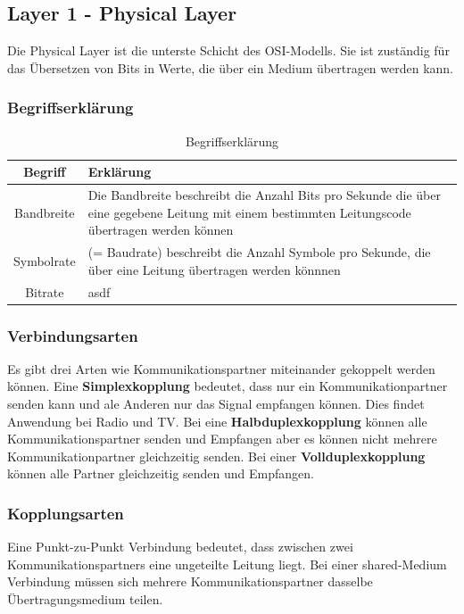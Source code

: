 \documentclass{article}
\begin{document}
\subsection{Layer 1 - Physical Layer}
Die Physical Layer ist die unterste Schicht des OSI-Modells. Sie ist zuständig für das Übersetzen von Bits in Werte, die über ein Medium übertragen werden kann.
\subsubsection{Begriffserklärung}
\begin{table}[h!]
		\begin{center}
				\caption{Begriffserklärung}
				\label{tab:Begriffserklärung}
				\begin{tabular}{|c|p{9cm}|}
						\hline
						\textbf{Begriff} & \textbf{Erklärung} \\
						\hline
						Bandbreite & Die Bandbreite beschreibt die Anzahl Bits pro Sekunde die über eine gegebene Leitung mit einem bestimmten Leitungscode übertragen werden können\\
						\hline
						Symbolrate & (= Baudrate) beschreibt die Anzahl Symbole pro Sekunde, die über eine Leitung übertragen werden könnnen\\
						\hline
						Bitrate & asdf\\
						\hline
				\end{tabular}
		\end{center}
\end{table}
\subsubsection{Verbindungsarten}
Es gibt drei Arten wie Kommunikationspartner miteinander gekoppelt werden können. Eine \textbf{Simplexkopplung} bedeutet, dass nur ein Kommunikationpartner senden kann und ale Anderen nur das Signal empfangen können. Dies findet Anwendung bei Radio und TV. Bei eine \textbf{Halbduplexkopplung} können alle Kommunikationspartner senden und Empfangen aber es können nicht mehrere Kommunikationpartner gleichzeitig senden. Bei einer \textbf{Vollduplexkopplung} können alle Partner gleichzeitig senden und Empfangen. 
\subsubsection{Kopplungsarten}
Eine Punkt-zu-Punkt Verbindung bedeutet, dass zwischen zwei Kommunikationspartners eine ungeteilte Leitung liegt. Bei einer shared-Medium Verbindung müssen sich mehrere Kommunikationspartner dasselbe Übertragungsmedium teilen.
\end{document}
